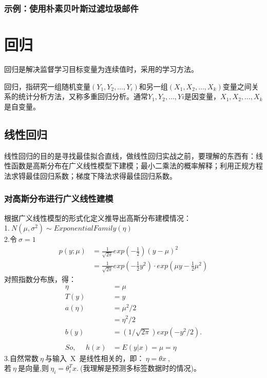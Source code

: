 \subsubsection{示例：使用朴素贝叶斯过滤垃圾邮件}
















\newpage
\section{回归}
回归是解决监督学习目标变量为连续值时，采用的学习方法。

回归，指研究一组随机变量$(Y_1,Y_2,\ldots,Y_i)$和另一组$(X_1,X_2,\ldots,X_k)$变量之间关系的统计分析方法，又称多重回归分析。通常$Y_1,Y_2,\ldots,Yi$是因变量，$X_1,X_2,\ldots,X_k$是自变量。

\subsection{线性回归}
线性回归的目的是寻找最佳拟合直线，做线性回归实战之前，要理解的东西有：线性函数是高斯分布在广义线性模型下建模；最小二乘法的概率解释；利用正规方程法求锝最佳回归系数；梯度下降法求得最佳回归系数。


\subsubsection{对高斯分布进行广义线性建模}
根据广义线性模型的形式化定义推导出高斯分布建模情况：\\
1.$~N(\mu,\sigma^2)\sim ExponentialFamily(\eta)$\\
2.令$~\sigma=1~$
\begin{equation}\nonumber
\begin{split}
  p(y;\mu)&=\frac{1}{\sqrt{2\pi}}exp(-\frac{1}{2})(y-\mu)^2\\
          &=\frac{1}{\sqrt{2\pi}}exp(-\frac{1}{2}y^2)\cdot exp(\mu y-\frac{1}{2} \mu ^2)
\end{split}
\end{equation}
对照指数分布族，得：
\begin{equation}\nonumber
\begin{split}
  \eta &= \mu\\
  T(y) &= y\\
  a(\eta)&=\mu^2/2\\
         &=\eta^2/2\\
  b(y)   &=(1/\sqrt{2\pi})exp(-y^2/2).\\
  ~\\
 So,~~~~~~ h(x) &=E(y|x)=\mu=\eta
\end{split}
\end{equation}
3.自然常数$~\eta~$与输入~X~是线性相关的，即：$~\eta = \theta x~$,\\
若$~\eta~$是向量,则$~\eta_i = \theta_i^T x.~$(我理解是预测多标签数据时的情况)。

